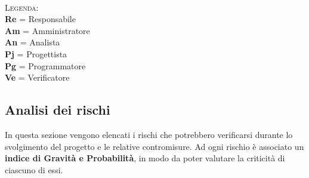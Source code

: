 \documentclass{article}
\begin{document}
        \\
        \textsc{Legenda:} \\
            \textbf{Re} = Responsabile \\
            \textbf{Am} = Amministratore \\
            \textbf{An} = Analista \\
            \textbf{Pj} = Progettista \\
            \textbf{Pg} = Programmatore \\
            \textbf{Ve} = Verificatore \\

    \subsection{Analisi dei rischi}
    In questa sezione vengono elencati i rischi che potrebbero verificarsi durante lo svolgimento del progetto e le relative contromisure. Ad ogni rischio è associato un \textbf{indice di Gravità e Probabilità},
    in modo da poter valutare la criticità di ciascuno di essi.
\end{document}
